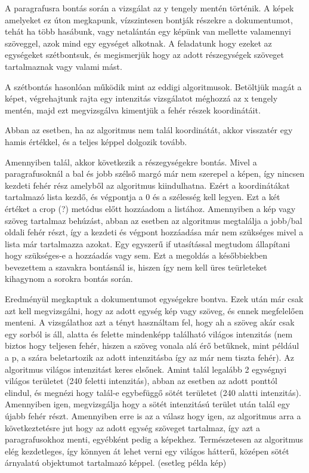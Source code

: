A paragrafusra bontás során a vizsgálat az y tengely mentén történik. A képek amelyeket ez úton megkapunk, vízszintesen bontják részekre a dokumentumot, tehát ha több hasábunk, vagy netalántán egy képünk van mellette valamennyi szöveggel, azok mind egy egységet alkotnak. A feladatunk hogy ezeket az egységeket szétbontsuk, és megismerjük hogy az adott részegységek szöveget tartalmaznak vagy valami mást.

A szétbontás hasonlóan működik mint az eddigi algoritmusok. Betöltjük magát a képet, végrehajtunk rajta egy intenzitás vizsgálatot méghozzá az x tengely mentén, majd ezt megvizsgálva kimentjük a fehér részek koordinátáit.

Abban az esetben, ha az algoritmus nem talál koordinátát, akkor visszatér egy hamis értékkel, és a teljes képpel dolgozik tovább.

Amennyiben talál, akkor következik a részegységekre bontás. Mivel a paragrafusoknál a bal és jobb szélső margó már nem szerepel a képen, így nincsen kezdeti fehér rész amelyből az algoritmus kiindulhatna. Ezért a koordinátákat tartalmazó lista kezdő, és végpontja a 0 és a szélesség kell legyen. Ezt a két értéket a crop (?) metódus előtt hozzáadom a listához. Amennyiben a kép vagy szöveg tartalmaz behúzást, abban az esetben az algoritmus megtalálja a jobb/bal oldali fehér részt, így a kezdeti és végpont hozzáadása már nem szükséges mivel a lista már tartalmazza azokat. Egy egyszerű if utasítással megtudom állapítani hogy szükséges-e a hozzáadás vagy sem. Ezt a megoldás a későbbiekben bevezettem a szavakra bontásnál is, hiszen így nem kell üres teürleteket kihagynom a sorokra bontás során.

Eredményül megkaptuk a dokumentumot egységekre bontva. Ezek után már csak azt kell megvizsgálni, hogy az adott egység kép vagy szöveg, és ennek megfelelően menteni. A vizsgálathoz azt a tényt használtam fel, hogy ah a szöveg akár csak egy sorból is áll, alatta és felette mindenképp található világos intenzitás (nem biztos hogy teljesen fehér, hiszen a szöveg vonala alá érő betűknek, mint például a p, a szára beletartozik az adott intenzitásba így az már nem tiszta fehér). Az algoritmus világos intenzitást keres elsőnek. Amint talál legalább 2 egységnyi világos területet (240 feletti intenzitás), abban az esetben az adott ponttól elindul, és megnézi hogy talál-e egybefüggő sötét területet (240 alatti intenzitás). Amennyiben igen, megvizsgálja hogy a sötét intenzitású terület után talál egy újabb fehér részt. Amennyiben erre is az a válasz hogy igen, az algoritmus arra a következtetésre jut hogy az adott egység szöveget tartalmaz, így azt a paragrafusokhoz menti, egyébként pedig a képekhez. Természetesen az algoritmus elég kezdetleges, így könnyen át lehet verni egy világos hátterű, középen sötét árnyalatú objektumot tartalmazó képpel. (esetleg példa kép)

